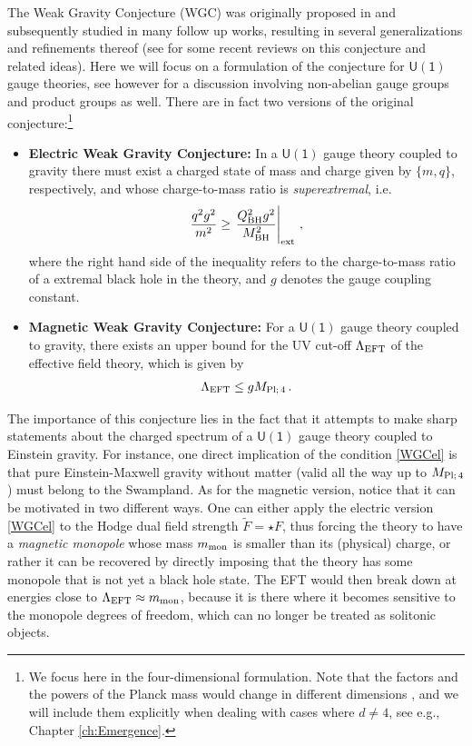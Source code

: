 The Weak Gravity Conjecture (WGC) was originally proposed in \cite{Arkani-Hamed:2006emk} and subsequently studied in many follow up works, resulting in several generalizations and refinements thereof (see \cite{Palti:2020mwc, Harlow:2022gzl} for some recent reviews on this conjecture and related ideas). Here we will focus on a formulation of the conjecture for $\mathsf{U(1)}$ gauge theories, see however \cite{Heidenreich:2017sim} for a discussion involving non-abelian gauge groups and product groups as well. There are in fact two versions of the original conjecture:\footnote{We focus here in the four-dimensional formulation. Note that the factors and the powers of the Planck mass would change in different dimensions \cite{Heidenreich:2015nta}, and we will include them explicitly when dealing with cases where $d \neq 4$, see e.g., Chapter \ref{ch:Emergence}.} 
%
\begin{itemize}
\item[] \textbf{Electric Weak Gravity Conjecture:} 
In a $\mathsf{U(1)}$ gauge theory coupled to gravity there must exist a charged state of mass and charge given by $\{m, q\}$, respectively, and whose charge-to-mass ratio is \emph{superextremal}, i.e. 
%
\begin{align}\label{WGCel}
 \frac{q^2 g^2}{m^2} \geq \left. \frac{Q_{\rm BH}^2 g^2}{M_{\rm BH}^2}\right|_{\text{ext}}\, ,
\end{align}
%
where the right hand side of the inequality refers to the charge-to-mass ratio of a extremal black hole in the theory, and $g$ denotes the gauge coupling constant. 
\item[] \textbf{Magnetic Weak Gravity Conjecture:} 
For a $\mathsf{U(1)}$ gauge theory coupled to gravity, there exists an upper bound for the UV cut-off $\Lambda_{\rm EFT}$ of the effective field theory, which is given by 
%
\begin{align}\label{WGCmag}
\Lambda_{\rm EFT} \leq g M_{\text{Pl;}\, 4}\, . 
\end{align}
%
\end{itemize}
%
The importance of this conjecture lies in the fact that it attempts to make sharp statements about the charged spectrum of a $\mathsf{U(1)}$ gauge theory coupled to Einstein gravity. For instance, one direct implication of the condition \eqref{WGCel} is that pure Einstein-Maxwell gravity without matter (valid all the way up to $M_{\text{Pl;}\, 4}$) must belong to the Swampland. As for the magnetic version, notice that it can be motivated in two different ways. One can either apply the electric version \eqref{WGCel} to the Hodge dual field strength $\tilde{F} = \star F$, thus forcing the theory to have a \emph{magnetic monopole} whose mass $m_{\rm mon}$ is smaller than its (physical) charge, or rather it can be recovered by directly imposing that the theory has some monopole that is not yet a black hole state. The EFT would then break down at energies close to $\Lambda_{\rm EFT} \approx m_{\rm mon}$, because it is there where it becomes sensitive to the monopole degrees of freedom, which can no longer be treated as solitonic objects.

